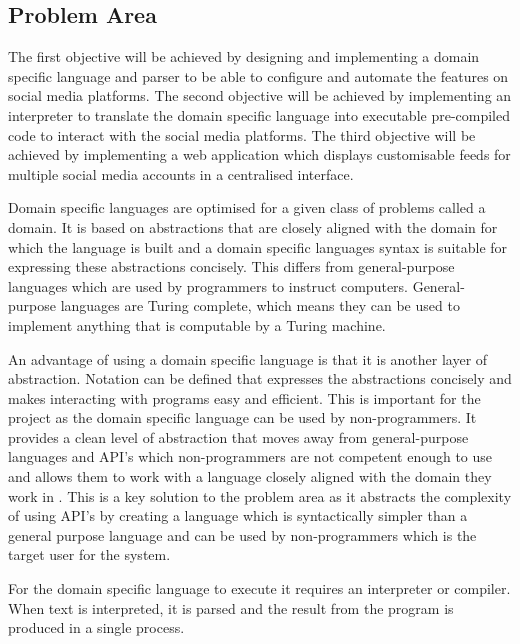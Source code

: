 \documentclass[chapterprefix=false]{scrreprt}
\begin{document}
\subsection{Problem Area}

The first objective will be achieved by designing and implementing a domain specific language and parser to be able to configure and automate the features on social media platforms. The second objective will be achieved by implementing an interpreter to translate the domain specific language into executable pre-compiled code to interact with the social media platforms. The third objective will be achieved by implementing a web application which displays customisable feeds for multiple social media accounts in a centralised interface.

Domain specific languages are optimised for a given class of problems called a domain.  It is based on abstractions that are closely aligned with the domain for which the language is built and a domain specific languages syntax is suitable for expressing these abstractions concisely. This differs from general-purpose languages which are used by programmers to instruct computers. General-purpose languages are Turing complete, which means they can be used to implement anything that is computable by a Turing machine.\cite{DslEngineering2013}

An advantage of using a domain specific language is that it is another layer of abstraction. Notation can be defined that expresses the abstractions concisely and makes interacting with programs easy and efficient. This is important for the project as the domain specific language can be used by non-programmers. It provides a clean level of abstraction that moves away from general-purpose languages and API’s which non-programmers are not competent enough to use and allows them to work with a language closely aligned with the domain they work in \cite{DslEngineering2013}. This is a key solution to the problem area as it abstracts the complexity of using API’s by creating a language which is syntactically simpler than a general purpose language and can be used by non-programmers which is the target user for the system.

For the domain specific language to execute it requires an interpreter or compiler. When text is interpreted, it is parsed and the result from the program is produced in a single process. 
\end{document}
